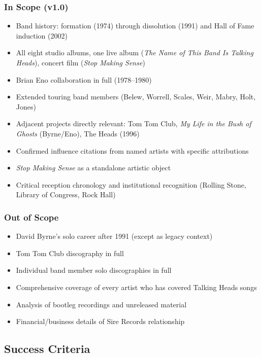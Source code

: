 \documentclass[11pt,letterpaper]{article}
\begin{document}
\subsubsection{In Scope (v1.0)}
\begin{itemize}[leftmargin=*]
  \item Band history: formation (1974) through dissolution (1991) and Hall of Fame induction (2002)
  \item All eight studio albums, one live album (\textit{The Name of This Band Is Talking Heads}), concert film (\textit{Stop Making Sense})
  \item Brian Eno collaboration in full (1978--1980)
  \item Extended touring band members (Belew, Worrell, Scales, Weir, Mabry, Holt, Jones)
  \item Adjacent projects directly relevant: Tom Tom Club, \textit{My Life in the Bush of Ghosts} (Byrne/Eno), The Heads (1996)
  \item Confirmed influence citations from named artists with specific attributions
  \item \textit{Stop Making Sense} as a standalone artistic object
  \item Critical reception chronology and institutional recognition (Rolling Stone, Library of Congress, Rock Hall)
\end{itemize}

\subsubsection{Out of Scope}
\begin{itemize}[leftmargin=*]
  \item David Byrne's solo career after 1991 (except as legacy context)
  \item Tom Tom Club discography in full
  \item Individual band member solo discographies in full
  \item Comprehensive coverage of every artist who has covered Talking Heads songs
  \item Analysis of bootleg recordings and unreleased material
  \item Financial/business details of Sire Records relationship
\end{itemize}

\subsection{Success Criteria}
\end{document}
